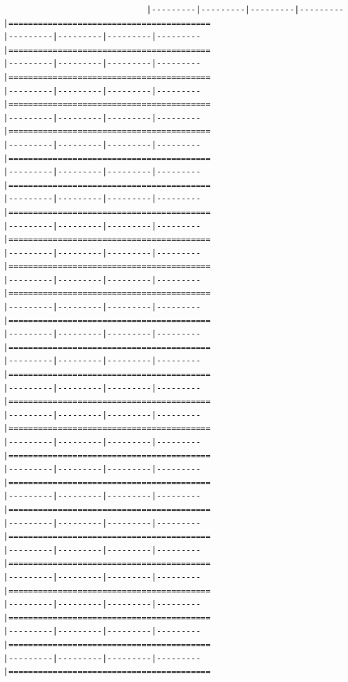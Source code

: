 \documentclass[
]{article}
\begin{document}
\begin{verbatim}
                             |---------|---------|---------|---------|=========================================                                          |---------|---------|---------|---------|=========================================                                          |---------|---------|---------|---------|=========================================                                          |---------|---------|---------|---------|=========================================                                          |---------|---------|---------|---------|=========================================                                          |---------|---------|---------|---------|=========================================                                          |---------|---------|---------|---------|=========================================                                          |---------|---------|---------|---------|=========================================                                          |---------|---------|---------|---------|=========================================                                          |---------|---------|---------|---------|=========================================                                          |---------|---------|---------|---------|=========================================                                          |---------|---------|---------|---------|=========================================                                          |---------|---------|---------|---------|=========================================                                          |---------|---------|---------|---------|=========================================                                          |---------|---------|---------|---------|=========================================                                          |---------|---------|---------|---------|=========================================                                          |---------|---------|---------|---------|=========================================                                          |---------|---------|---------|---------|=========================================                                          |---------|---------|---------|---------|=========================================                                          |---------|---------|---------|---------|=========================================                                          |---------|---------|---------|---------|=========================================                                          |---------|---------|---------|---------|=========================================                                          |---------|---------|---------|---------|=========================================                                          |---------|---------|---------|---------|=========================================                                          |---------|---------|---------|---------|=========================================                                          
\end{verbatim}
\end{document}
